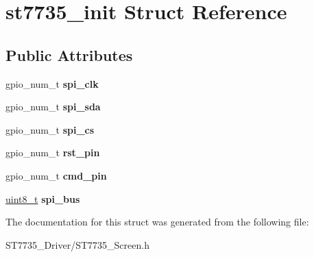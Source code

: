 \hypertarget{structst7735__init}{}\section{st7735\+\_\+init Struct Reference}
\label{structst7735__init}
\subsection*{Public Attributes}
\begin{DoxyCompactItemize}
\item 
\mbox{\label{structst7735__init_a1def2bab89f5133bb27bba41ffe1beb5}} 
gpio\+\_\+num\+\_\+t {\bfseries spi\+\_\+clk}
\item 
\mbox{\label{structst7735__init_ab862dde006a855303b4a4f7a24857703}} 
gpio\+\_\+num\+\_\+t {\bfseries spi\+\_\+sda}
\item 
\mbox{\label{structst7735__init_a3c15dc53d8e3d3ef89294e22403a86c7}} 
gpio\+\_\+num\+\_\+t {\bfseries spi\+\_\+cs}
\item 
\mbox{\label{structst7735__init_aefefb536986b98d73041e8ca73689711}} 
gpio\+\_\+num\+\_\+t {\bfseries rst\+\_\+pin}
\item 
\mbox{\label{structst7735__init_ac5ee0ac6dbd989ea01bb1e721c378bf7}} 
gpio\+\_\+num\+\_\+t {\bfseries cmd\+\_\+pin}
\item 
\mbox{\label{structst7735__init_aa93dc313ff3f9d7cdd035b5c70ba6a60}} 
\hyperlink{vl53l0x__types_8h_aba7bc1797add20fe3efdf37ced1182c5}{uint8\+\_\+t} {\bfseries spi\+\_\+bus}
\end{DoxyCompactItemize}


The documentation for this struct was generated from the following file\+:\begin{DoxyCompactItemize}
\item 
S\+T7735\+\_\+\+Driver/S\+T7735\+\_\+\+Screen.\+h\end{DoxyCompactItemize}
